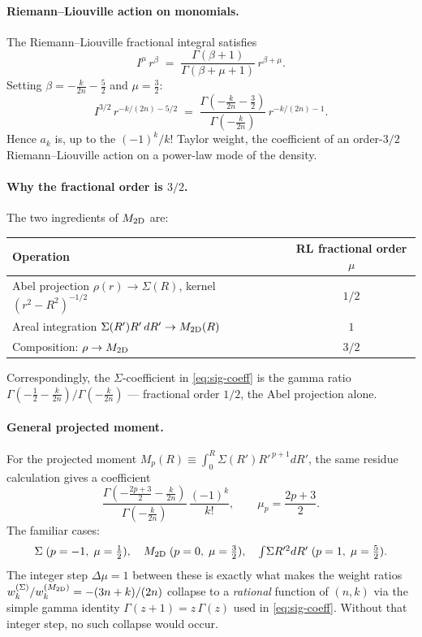 \documentclass{article}
\begin{document}
\paragraph{Riemann--Liouville action on monomials.}
The Riemann--Liouville fractional integral satisfies
\begin{equation}\label{eq:RL}
I^{\mu}\,r^{\beta}
\;=\;\frac{\Gamma(\beta+1)}{\Gamma(\beta+\mu+1)}\,r^{\beta+\mu}.
\end{equation}
Setting $\beta=-\tfrac{k}{2n}-\tfrac{5}{2}$ and $\mu=\tfrac{3}{2}$:
\begin{equation}
I^{3/2}\,r^{-k/(2n)-5/2}
\;=\;\frac{\Gamma(-\tfrac{k}{2n}-\tfrac{3}{2})}{\Gamma(-\tfrac{k}{2n})}\,
   r^{-k/(2n)-1}.
\end{equation}
Hence $a_k$ is, up to the $(-1)^k/k!$ Taylor weight, the coefficient of an
order-$3/2$ Riemann--Liouville action on a power-law mode of the density.

\paragraph{Why the fractional order is $3/2$.}
The two ingredients of $M_{\rm 2D}$ are:
\begin{center}
\renewcommand{\arraystretch}{1.3}
\begin{tabular}{lc}
\toprule
Operation & RL fractional order $\mu$\\
\midrule
Abel projection $\rho(r)\to\Sigma(R)$, kernel $(r^2-R^2)^{-1/2}$ & $1/2$\\
Areal integration $\Sigma(R')R'\,dR'\to M_{\rm 2D}(R)$ & $1$\\
\midrule
Composition: $\rho\to M_{\rm 2D}$ & $\boxed{3/2}$\\
\bottomrule
\end{tabular}
\end{center}
Correspondingly, the $\Sigma$-coefficient in \eqref{eq:sig-coeff} is the
gamma ratio $\Gamma(-\tfrac{1}{2}-\tfrac{k}{2n})/\Gamma(-\tfrac{k}{2n})$ ---
fractional order $1/2$, the Abel projection alone.

\paragraph{General projected moment.}
For the projected moment
$M_p(R)\equiv\int_0^R\Sigma(R')R'^{\,p+1}dR'$, the same residue
calculation gives a coefficient
\begin{equation}\label{eq:gen-frac}
\frac{\Gamma\!\left(-\tfrac{2p+3}{2}-\tfrac{k}{2n}\right)}
     {\Gamma\!\left(-\tfrac{k}{2n}\right)}\,\frac{(-1)^k}{k!},
\qquad
\mu_p=\frac{2p+3}{2}.
\end{equation}
The familiar cases:
\[
\Sigma\;(p=-1,\;\mu=\tfrac12),\quad
M_{\rm 2D}\;(p=0,\;\mu=\tfrac32),\quad
\textstyle\int\!\Sigma R'^2 dR'\;(p=1,\;\mu=\tfrac52).
\]
The integer step $\Delta\mu=1$ between these is exactly what makes the
weight ratios $w_k^{(\Sigma)}/w_k^{(M_{\rm 2D})}=-(3n+k)/(2n)$ collapse to a
\emph{rational} function of $(n,k)$ via the simple gamma identity
$\Gamma(z+1)=z\,\Gamma(z)$ used in \eqref{eq:sig-coeff}. Without that integer
step, no such collapse would occur.
\end{document}
